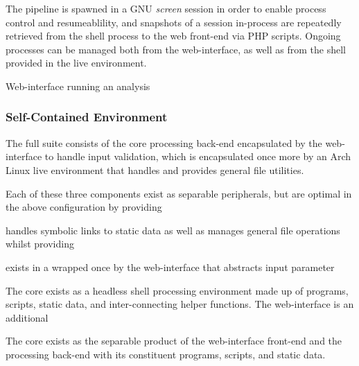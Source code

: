 The pipeline is spawned in a GNU \textit{screen} session in order to enable process control and resumeablility, and snapshots of a session in-process are repeatedly retrieved from the shell process to the web front-end via PHP scripts. Ongoing \app processes can be managed both from the web-interface, as well as from the shell provided in the live environment.


{Web-interface running an analysis}


\subsubsection{Self-Contained Environment}

The full \app suite consists of the core \app processing back-end encapsulated by the web-interface to handle input validation, which is encapsulated once more by an Arch Linux live environment that handles and provides general file utilities.

Each of these three components exist as separable peripherals, but are optimal in the above configuration by providing 




 handles symbolic links to static data as well as manages general file operations whilst providing

exists in a wrapped once by the web-interface that abstracts input parameter 


The core \app exists as a headless shell processing environment made up of programs, scripts, static data, and inter-connecting helper functions. The web-interface is an additional 

The core \app exists as the separable product of the web-interface front-end and the processing back-end with its constituent programs, scripts, and static data. 